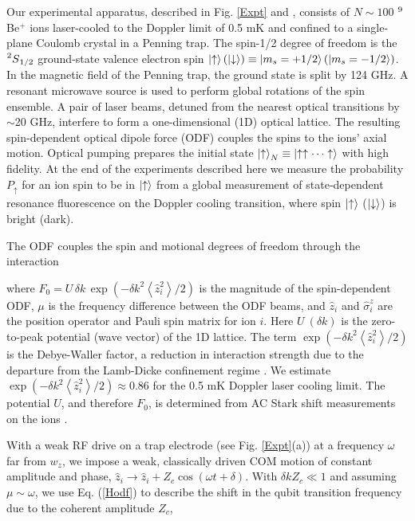 \documentclass[aps,prl,twocolumn,superscriptaddress,floatfix,nofootinbib]{revtex4-1}
\begin{document}
Our experimental apparatus, described in Fig. \ref{Expt} and \citep{Sawyer2014,Bohnet2015}, consists of $N\sim100$ $\prescript{9}{}{}$Be$^{+}$ ions laser-cooled to the Doppler limit of 0.5 mK and confined to a single-plane Coulomb crystal in a Penning trap. The spin-1/2 degree of freedom is the $\prescript{2}{}{S}_{1/2}$ ground-state valence electron spin $\ket{\uparrow} (\ket{\downarrow}) \equiv \ket{m_{s}=+1/2} (\ket{m_{s}=-1/2}) $. In the magnetic field of the Penning trap, the ground state is split by 124 GHz. A resonant microwave source is used to perform global rotations of the spin ensemble. A pair of laser beams, detuned from the nearest optical transitions by $\sim$20 GHz, interfere to form a one-dimensional (1D) optical lattice. The resulting spin-dependent optical dipole force (ODF) couples the spins to the ions' axial motion. Optical pumping prepares the initial state $\ket{\uparrow}_N \equiv \ket{\uparrow \uparrow \cdots \uparrow}$ with high fidelity. At the end of the experiments described here we measure the probability $P_\uparrow$ for an ion spin to be in $\ket{\uparrow}$ from a global measurement of state-dependent resonance fluorescence on the Doppler cooling transition, where spin $\ket{\uparrow}$ ($\ket{\downarrow}$) is bright (dark).

The ODF couples the spin and motional degrees of freedom through the interaction \citep{Bohnet2015}

where $F_0= U \, \delta k \, \exp(-\delta k^2 \left< \hat{z}^{2}_{i} \right> / 2)$ is the magnitude of the spin-dependent ODF, $\mu$ is the frequency difference between the ODF beams, and $\hat{z}_{i}$ and $\hat{\sigma}^{z}_{i}$ are the position operator and Pauli spin matrix for ion $i$. Here $U\:(\delta k)$ is the zero-to-peak potential (wave vector) of the 1D lattice. The term $\exp(-\delta k^2 \left< \hat{z}^{2}_{i} \right> / 2)$ is the Debye-Waller factor, a reduction in interaction strength due to the departure from the Lamb-Dicke confinement regime \citep{Wineland1998a}. We estimate $\exp(-\delta k^2 \left< \hat{z}^{2}_{i} \right> / 2) \approx 0.86 $ for the 0.5 mK Doppler laser cooling limit. The potential $U$, and therefore $F_0$, is determined from AC Stark shift measurements on the ions \citep{Britton2012}. 

With a weak RF drive on a trap electrode (see Fig. \ref{Expt}(a)) at a frequency $\omega$ far from $w_{z}$, we impose a weak, classically driven COM motion of constant amplitude and phase, $\hat{z}_i \rightarrow \hat{z}_i +Z_c\cos(\omega t+\delta)$. With $\delta k Z_c \ll 1$ and assuming $\mu\sim\omega$, we use Eq. (\ref{Hodf}) to describe the shift in the qubit transition frequency due to the coherent amplitude $Z_c$,
\end{document}
